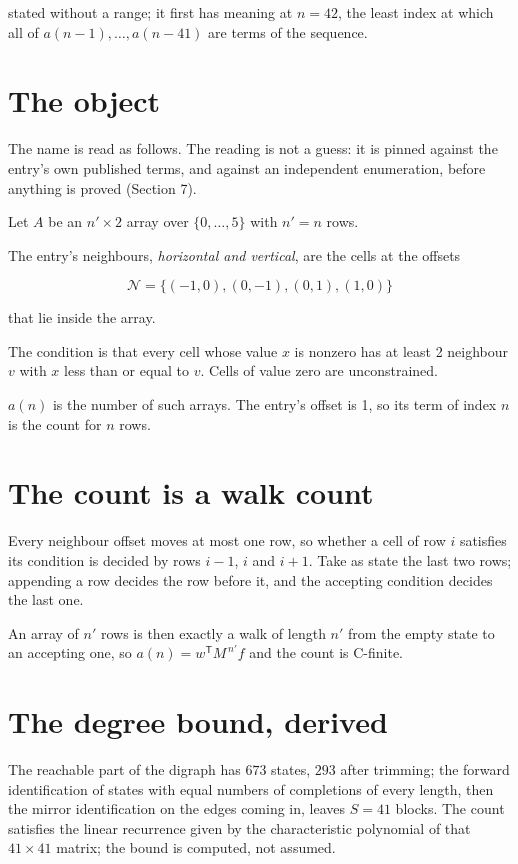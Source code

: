 \documentclass[11pt]{article}
\theoremstyle{definition}
\begin{document}
stated without a range; it first has meaning at $n = 42$, the least index at which all of $a(n-1),\dots,a(n-41)$ are terms of the sequence.

\section{The object}

The name is read as follows. The reading is not a guess: it is pinned against the entry's own published terms, and against an independent enumeration, before anything is proved (Section 7).

Let $A$ be an $n' \times 2$ array over $\{0,\dots,5\}$ with $n' = n$ rows.

The entry's neighbours, {\itshape horizontal and vertical}, are the cells at the offsets

\[\mathcal{N} = \{(-1,0), (0,-1), (0,1), (1,0)\}\]

that lie inside the array.

The condition is that every cell whose value $x$ is nonzero has at least 2 neighbour $v$ with $x$ less than or equal to $v$. Cells of value zero are unconstrained.

$a(n)$ is the number of such arrays. The entry's offset is 1, so its term of index $n$ is the count for $n$ rows.

\section{The count is a walk count}

Every neighbour offset moves at most one row, so whether a cell of row $i$ satisfies its condition is decided by rows $i-1$, $i$ and $i+1$. Take as state the last two rows; appending a row decides the row before it, and the accepting condition decides the last one.

An array of $n'$ rows is then exactly a walk of length $n'$ from the empty state to an accepting one, so $a(n) = w^{\mathsf T}M^{\,n'}f$ and the count is C-finite.

\section{The degree bound, derived}

The reachable part of the digraph has $673$ states, $293$ after trimming; the forward identification of states with equal numbers of completions of every length, then the mirror identification on the edges coming in, leaves $S = 41$ blocks. The count satisfies the linear recurrence given by the characteristic polynomial of that $41\times41$ matrix; the bound is computed, not assumed.
\end{document}
